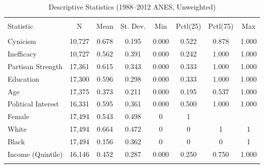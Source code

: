 \begin{table}[!h] \centering 
  \caption{Descriptive Statistics (1988--2012 ANES, Unweighted)} 
  \label{tab:desc-cdf} 
\begin{adjustbox}{width=\linewidth,center}
\begin{tabular}{@{\extracolsep{5pt}}lccccccc} 
\\[-1.8ex]\hline
\hline \\[-1.8ex] 
Statistic & \multicolumn{1}{c}{N} & \multicolumn{1}{c}{Mean} & \multicolumn{1}{c}{St. Dev.} & \multicolumn{1}{c}{Min} & \multicolumn{1}{c}{Pctl(25)} & \multicolumn{1}{c}{Pctl(75)} & \multicolumn{1}{c}{Max} \\ 
\hline \\[-1.8ex] 
Cynicism & 10,727 & 0.678 & 0.195 & 0.000 & 0.522 & 0.878 & 1.000 \\ 
Inefficacy & 10,727 & 0.562 & 0.391 & 0.000 & 0.242 & 1.000 & 1.000 \\ 
Partisan Strength & 17,361 & 0.615 & 0.343 & 0.000 & 0.333 & 1.000 & 1.000 \\ 
Education & 17,300 & 0.596 & 0.298 & 0.000 & 0.333 & 1.000 & 1.000 \\ 
Age & 17,375 & 0.373 & 0.211 & 0.000 & 0.195 & 0.537 & 1.000 \\ 
Political Interest & 16,331 & 0.595 & 0.361 & 0.000 & 0.500 & 1.000 & 1.000 \\ 
Female & 17,494 & 0.543 & 0.498 & 0 & 1 \\ 
White & 17,494 & 0.664 & 0.472 & 0 & 0 & 1 & 1 \\ 
Black & 17,494 & 0.156 & 0.362 & 0 & 0 & 0 & 1 \\ 
Income (Quintile) & 16,146 & 0.452 & 0.287 & 0.000 & 0.250 & 0.750 & 1.000 \\ 
\hline \\[-1.8ex] 
\end{tabular} 
\end{adjustbox}
\end{table} 